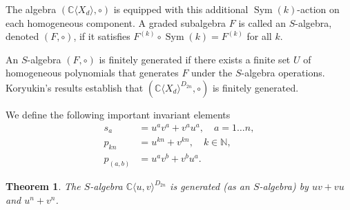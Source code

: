 \documentclass{amsart}[12pt]
\newtheorem{theorem}{Theorem}%
\theoremstyle{definition}
\DeclareMathOperator{\Sym}{Sym}
\newcommand{\N}{{\mathbb{N}}}
\newcommand{\CuvD}{{\mathbb C}\langle u,v\rangle^{D_{2n}}}
\begin{document}
The algebra $({\mathbb C}\langle X_d\rangle,\circ)$ is equipped with this additional $\Sym(k)$-action on each homogeneous component. A graded subalgebra $F$ is called an $S$-algebra, denoted $(F,\circ)$, if it satisfies $F^{(k)} \circ \Sym(k) = F^{(k)}$ for all $k$.

An $S$-algebra $(F,\circ)$ is finitely generated if there exists a finite set $U$ of homogeneous polynomials that generates $F$ under the $S$-algebra operations. Koryukin's results \cite{Kor} establish that $(\mathbb C\langle X_d\rangle^{D_{2n}},\circ)$ is finitely generated.

We define the following important invariant elements
\begin{align*}
	s_a       & = u^a v^a+v^a u^a, \quad a=1\dots n,\\
	p_{kn}    & =u^{kn}+v^{kn}, \quad k\in \N,\\
	p_{(a,b)} & =u^{a}v^{b}+v^{b}u^{a}.
\end{align*}

\begin{theorem}
	The $S$-algebra $\CuvD$ is generated (as an $S$-algebra) by $uv+vu$ and $u^n+v^n$.
\end{theorem}
\end{document}
